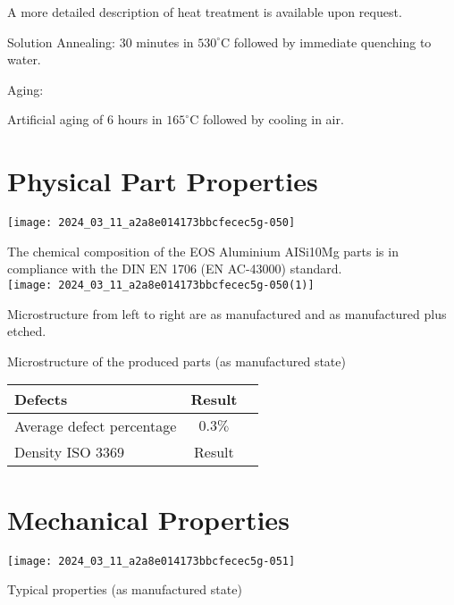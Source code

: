 \documentclass[10pt]{article}
\begin{document}
A more detailed description of heat treatment is available upon request.

Solution Annealing: 30 minutes in $530^{\circ} \mathrm{C}$ followed by immediate quenching to water.

Aging:

Artificial aging of 6 hours in $165^{\circ} \mathrm{C}$ followed by cooling in air.

\section*{Physical Part Properties}
\begin{center}
\texttt{[image: 2024\_03\_11\_a2a8e014173bbcfecec5g-050]}
\end{center}

The chemical composition of the EOS Aluminium AISi10Mg parts is in compliance with the DIN EN 1706 (EN AC-43000) standard.\\
\texttt{[image: 2024\_03\_11\_a2a8e014173bbcfecec5g-050(1)]}

Microstructure from left to right are as manufactured and as manufactured plus etched.

Microstructure of the produced parts (as manufactured state)

\begin{center}
\begin{tabular}{lcc}
\hline
Defects & Result \\
\hline
Average defect percentage & $0.3 \%$ \\
\hline
Density ISO 3369 & Result \\
\hline
\end{tabular}
\end{center}

\section*{Mechanical Properties}
\begin{center}
\texttt{[image: 2024\_03\_11\_a2a8e014173bbcfecec5g-051]}
\end{center}

Typical properties (as manufactured state)
\end{document}
